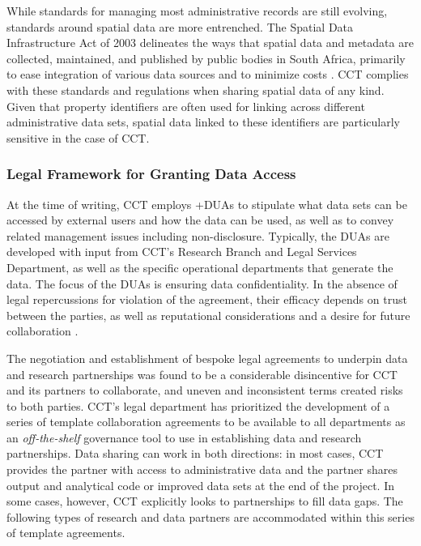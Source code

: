 \documentclass[
]{WileySix}
\begin{document}
While standards for managing most administrative records are still evolving, standards around spatial data are more entrenched. The Spatial Data Infrastructure Act of 2003 delineates the ways that spatial data and metadata are collected, maintained, and published by public bodies in South Africa, primarily to ease integration of various data sources and to minimize costs \citep{republicofsouthafrica2003}. CCT complies with these standards and regulations when sharing spatial data of any kind. Given that property identifiers are often used for linking across different administrative data sets, spatial data linked to these identifiers are particularly sensitive in the case of CCT.

\hypertarget{legal-framework-for-granting-data-access-6}{%
\subsubsection{Legal Framework for Granting Data Access}\label{legal-framework-for-granting-data-access-6}}

At the time of writing, CCT employs +DUAs\textbar{} to stipulate what data sets can be accessed by external users and how the data can be used, as well as to convey related management issues including non-disclosure. Typically, the DUAs are developed with input from CCT's Research Branch and Legal Services Department, as well as the specific operational departments that generate the data. The focus of the DUAs is ensuring data confidentiality. In the absence of legal repercussions for violation of the agreement, their efficacy depends on trust between the parties, as well as reputational considerations and a desire for future collaboration \citep{sexton2017}.

The negotiation and establishment of bespoke legal agreements to underpin data and research partnerships was found to be a considerable disincentive for CCT and its partners to collaborate, and uneven and inconsistent terms created risks to both parties. CCT's legal department has prioritized the development of a series of template collaboration agreements to be available to all departments as an \emph{off-the-shelf} governance tool to use in establishing data and research partnerships. Data sharing can work in both directions: in most cases, CCT provides the partner with access to administrative data and the partner shares output and analytical code or improved data sets at the end of the project. In some cases, however, CCT explicitly looks to partnerships to fill data gaps. The following types of research and data partners are accommodated within this series of template agreements.
\end{document}
